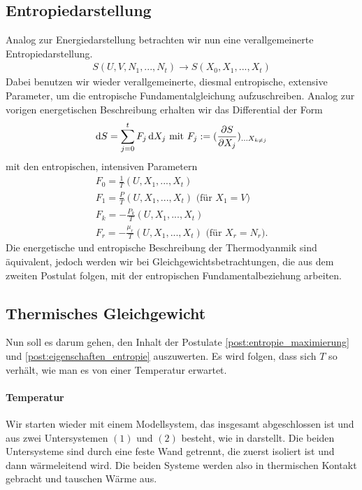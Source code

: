 \subsection{Entropiedarstellung}
Analog zur Energiedarstellung betrachten wir nun eine verallgemeinerte Entropiedarstellung.
\begin{align}
    S(U,V,N_1,...,N_t) \rightarrow S(X_0,X_1,...,X_t)
\end{align}
Dabei benutzen wir wieder verallgemeinerte, diesmal entropische, extensive Parameter, um die entropische Fundamentalgleichung aufzuschreiben. Analog zur vorigen energetischen Beschreibung erhalten wir das Differential der Form
\begin{align}
    \mathop{}\!\mathrm{d} S = \sum_{j=0}^tF_j\mathop{}\!\mathrm{d} X_j \text{ mit }F_j:=(\frac{\partial S}{\partial X_j})_{...X_{k\neq j}}
\end{align}
mit den entropischen, intensiven Parametern
\begin{align}
    F_0=\frac{1}{T}(U,X_1,...,X_t)\\
    F_1=\frac{P}{T}(U,X_1,...,X_t)\text{ (für $X_1=V$)}\\
    F_k=-\frac{P_k}{T}(U,X_1,...,X_t)\\
    F_r=-\frac{\mu_r}{T}(U,X_1,...,X_t) \text{ (für $X_r=N_r$)}. 
\end{align}
Die energetische und entropische Beschreibung der Thermodyanmik sind äquivalent, jedoch werden wir bei Gleichgewichtsbetrachtungen, die aus dem zweiten Postulat folgen, mit der entropischen Fundamentalbeziehung arbeiten.

\subsection{Thermisches Gleichgewicht\label{sec:thermisches_gleichgewicht}}

Nun soll es darum gehen, den Inhalt der Postulate \ref{post:entropie_maximierung} und \ref{post:eigenschaften_entropie} auszuwerten.
Es wird folgen, dass sich $T$ so verhält, wie man es von einer Temperatur erwartet.

\paragraph*{Temperatur}

Wir starten wieder mit einem Modellsystem, das insgesamt abgeschlossen ist und aus zwei Untersystemen $(1)$ und $(2)$ besteht, wie in  darstellt.
Die beiden Untersysteme sind durch eine feste Wand getrennt, die zuerst isoliert ist und dann wärmeleitend wird. Die beiden Systeme werden also in thermischen Kontakt gebracht und tauschen Wärme aus.

